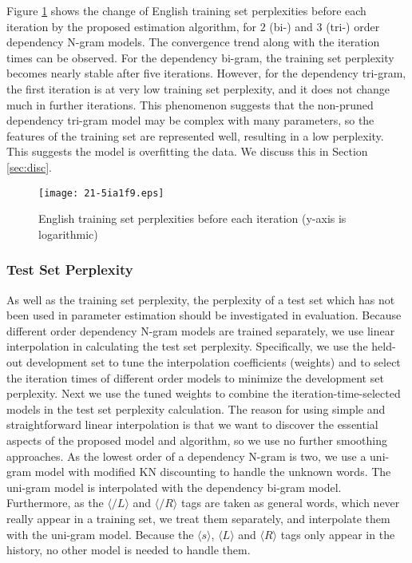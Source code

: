 \documentclass[english]{jnlp_1.4}
\begin{document}
Figure \ref{converge} shows the change of English training set perplexities before each iteration by the proposed estimation algorithm, for $2$ (bi-) and $3$ (tri-) order dependency N-gram models. The convergence trend along with the iteration times can be observed. For the dependency bi-gram, the training set perplexity becomes nearly stable after five iterations. However, for the dependency tri-gram, the first iteration is at very low training set perplexity, and it does not change much in further iterations. This phenomenon suggests that the non-pruned dependency tri-gram model may be complex with many parameters, so the features of the training set are represented well, resulting in a low perplexity. This suggests the model is overfitting the data. We discuss this in Section \ref{sec:disc}.

\begin{figure}[b]
\begin{center}
\texttt{[image: 21-5ia1f9.eps]}
\end{center}
\caption{English training set perplexities before each iteration (y-axis is logarithmic)}
\label{converge}
\end{figure}


\subsubsection{Test Set Perplexity}

As well as the training set perplexity, the perplexity of a test set which has not been used in parameter estimation should be investigated in evaluation. Because different order dependency N-gram models are trained separately, we use linear interpolation in calculating the test set perplexity. Specifically, we use the held-out development set to tune the interpolation coefficients (weights) and to select the iteration times of different order models to minimize the development set perplexity. Next we use the tuned weights to combine the iteration-time-selected models in the test set perplexity calculation. The reason for using simple and straightforward linear interpolation is that we want to discover the essential aspects of the proposed model and algorithm, so we use no further smoothing approaches. As the lowest order of a dependency N-gram is two, we use a uni-gram model with modified KN discounting to handle the unknown words. The uni-gram model is interpolated with the dependency bi-gram model. Furthermore, as the $\langle \slash L \rangle$ and $\langle \slash R \rangle$ tags are taken as general words, which never really appear in a training set, we treat them separately, and interpolate them with the uni-gram model. Because the $\langle s \rangle$, $\langle L \rangle$ and $\langle R \rangle$ tags only appear in the history, no other model is needed to handle them. 
\end{document}
